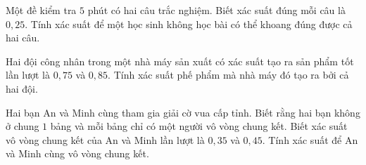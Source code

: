 \begin{bt}%
	Một đề kiểm tra $5$ phút có hai câu trắc nghiệm. Biết xác suất đúng mỗi câu là $0{,}25$. Tính xác suất để một học sinh không học bài có thể khoang đúng được cả hai câu.
\end{bt}

\begin{bt}%
	Hai đội công nhân trong một nhà máy sản xuất có xác suất tạo ra sản phẩm tốt lần lượt là $0{,}75$ và $0{,}85$. Tính xác suất phế phẩm mà nhà máy đó tạo ra bởi cả hai đội.
\end{bt}

\begin{bt}%
	Hai bạn An và Minh cùng tham gia giải cờ vua cấp tỉnh. Biết rằng hai bạn không ở chung $1$ bảng và mỗi bảng chỉ có một người vô vòng chung kết. Biết xác suất vô vòng chung kết của An và Minh lần lượt là $0{,}35$ và $0{,}45$. Tính xác suất để An và Minh cùng vô vòng chung kết.
\end{bt}

